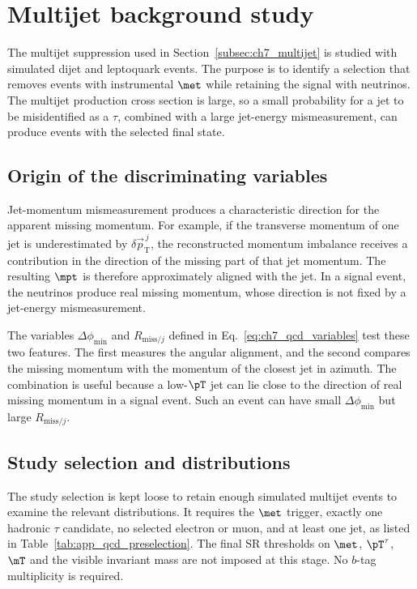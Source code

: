 \chapter{Multijet background study}
\label{App:QCD_bkg_study}

The multijet suppression used in Section~\ref{subsec:ch7_multijet} is studied with simulated dijet and leptoquark events.
The purpose is to identify a selection that removes events with instrumental $\met$ while retaining the signal with neutrinos.
The multijet production cross section is large, so a small probability for a jet to be misidentified as a $\tau$, combined with a large jet-energy mismeasurement, can produce events with the selected final state.

\section{Origin of the discriminating variables}
\label{sec:app_qcd_variables}

Jet-momentum mismeasurement produces a characteristic direction for the apparent missing momentum.
For example, if the transverse momentum of one jet is underestimated by $\delta\vec p_{\mathrm{T}}^{\,j}$, the reconstructed momentum imbalance receives a contribution in the direction of the missing part of that jet momentum.
The resulting $\mpt$ is therefore approximately aligned with the jet.
In a signal event, the neutrinos produce real missing momentum, whose direction is not fixed by a jet-energy mismeasurement.

The variables $\Delta\phi_{\min}$ and $R_{\mathrm{miss}/j}$ defined in Eq.~\ref{eq:ch7_qcd_variables} test these two features.
The first measures the angular alignment, and the second compares the missing momentum with the momentum of the closest jet in azimuth.
The combination is useful because a low-$\pT$ jet can lie close to the direction of real missing momentum in a signal event.
Such an event can have small $\Delta\phi_{\min}$ but large $R_{\mathrm{miss}/j}$.

\section{Study selection and distributions}
\label{sec:app_qcd_selection}

The study selection is kept loose to retain enough simulated multijet events to examine the relevant distributions.
It requires the $\met$ trigger, exactly one hadronic $\tau$ candidate, no selected electron or muon, and at least one jet, as listed in Table~\ref{tab:app_qcd_preselection}.
The final SR thresholds on $\met$, $\pT^\tau$, $\mT$ and the visible invariant mass are not imposed at this stage.
No $b$-tag multiplicity is required.

